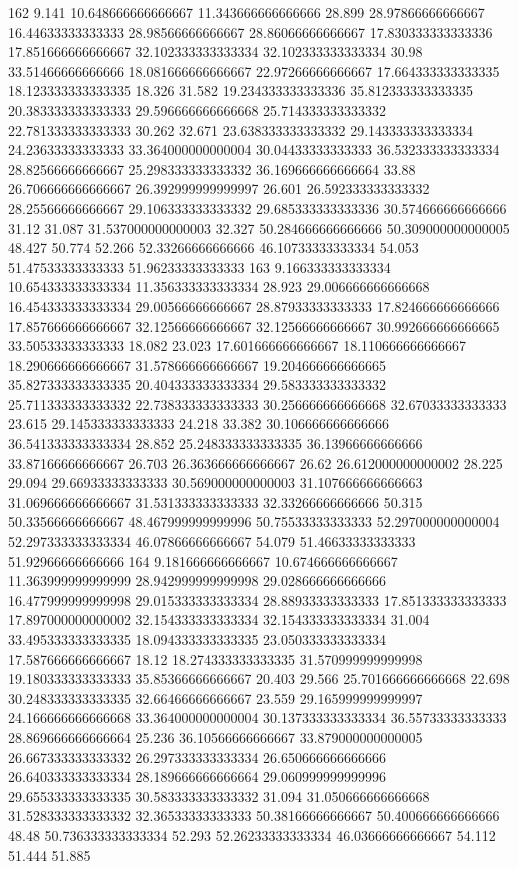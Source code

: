 162 9.141 10.648666666666667 11.343666666666666 28.899 28.97866666666667 16.44633333333333 28.98566666666667 28.86066666666667 17.830333333333336 17.851666666666667 32.102333333333334 32.102333333333334 30.98 33.51466666666666 18.081666666666667 22.97266666666667 17.664333333333335 18.123333333333335 18.326 31.582 19.234333333333336 35.812333333333335 20.383333333333333 29.596666666666668 25.714333333333332 22.781333333333333 30.262 32.671 23.638333333333332 29.143333333333334 24.23633333333333 33.364000000000004 30.04433333333333 36.532333333333334 28.82566666666667 25.298333333333332 36.169666666666664 33.88 26.706666666666667 26.392999999999997 26.601 26.592333333333332 28.25566666666667 29.106333333333332 29.685333333333336 30.574666666666666 31.12 31.087 31.537000000000003 32.327 50.284666666666666 50.309000000000005 48.427 50.774 52.266 52.33266666666666 46.10733333333334 54.053 51.47533333333333 51.96233333333333
163 9.166333333333334 10.654333333333334 11.356333333333334 28.923 29.006666666666668 16.454333333333334 29.00566666666667 28.87933333333333 17.824666666666666 17.857666666666667 32.12566666666667 32.12566666666667 30.992666666666665 33.50533333333333 18.082 23.023 17.601666666666667 18.110666666666667 18.290666666666667 31.578666666666667 19.204666666666665 35.827333333333335 20.404333333333334 29.583333333333332 25.711333333333332 22.738333333333333 30.256666666666668 32.67033333333333 23.615 29.145333333333333 24.218 33.382 30.106666666666666 36.541333333333334 28.852 25.248333333333335 36.13966666666666 33.87166666666667 26.703 26.363666666666667 26.62 26.612000000000002 28.225 29.094 29.66933333333333 30.569000000000003 31.107666666666663 31.069666666666667 31.531333333333333 32.33266666666666 50.315 50.33566666666667 48.467999999999996 50.75533333333333 52.297000000000004 52.297333333333334 46.07866666666667 54.079 51.46633333333333 51.92966666666666
164 9.181666666666667 10.674666666666667 11.363999999999999 28.942999999999998 29.028666666666666 16.477999999999998 29.015333333333334 28.88933333333333 17.851333333333333 17.897000000000002 32.154333333333334 32.154333333333334 31.004 33.495333333333335 18.094333333333335 23.050333333333334 17.587666666666667 18.12 18.274333333333335 31.570999999999998 19.180333333333333 35.85366666666667 20.403 29.566 25.701666666666668 22.698 30.248333333333335 32.66466666666667 23.559 29.165999999999997 24.166666666666668 33.364000000000004 30.137333333333334 36.55733333333333 28.869666666666664 25.236 36.10566666666667 33.879000000000005 26.667333333333332 26.297333333333334 26.650666666666666 26.640333333333334 28.189666666666664 29.060999999999996 29.655333333333335 30.583333333333332 31.094 31.050666666666668 31.528333333333332 32.36533333333333 50.38166666666667 50.400666666666666 48.48 50.736333333333334 52.293 52.26233333333334 46.03666666666667 54.112 51.444 51.885
